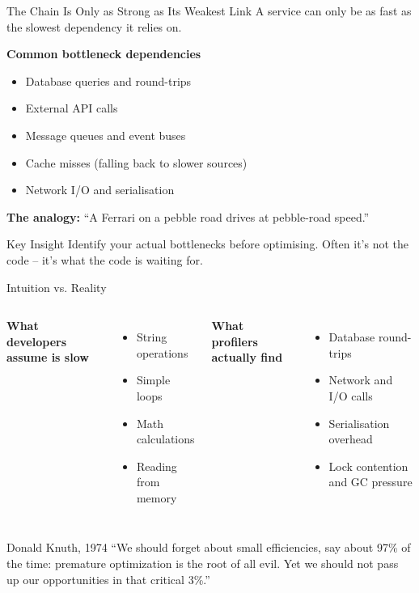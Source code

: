 \documentclass[aspectratio=1610, xcolor=table]{beamer}
\begin{document}
\begin{frame}{The Chain Is Only as Strong as Its Weakest Link}
	A service can only be as fast as the slowest dependency it relies on.

	\vspace{1em}
	\textbf{Common bottleneck dependencies}
	\begin{itemize}
		\item Database queries and round-trips
		\item External API calls
		\item Message queues and event buses
		\item Cache misses (falling back to slower sources)
		\item Network I/O and serialisation
	\end{itemize}

	\vspace{0.5em}
	\textcolor{SecondaryAccent}{\textbf{The analogy:}}
	``A Ferrari on a pebble road drives at pebble-road speed.''

	\vspace{0.5em}
	\begin{alertblock}{Key Insight}
		Identify your actual bottlenecks before optimising.
		Often it's not the code -- it's what the code is waiting for.
	\end{alertblock}
\end{frame}

\begin{frame}{Intuition vs. Reality}
	\begin{columns}[T]
		\textbf{What developers assume is slow}
		\begin{itemize}
			\item String operations
			\item Simple loops
			\item Math calculations
			\item Reading from memory
		\end{itemize}

		\textbf{What profilers actually find}
		\begin{itemize}
			\item Database round-trips
			\item Network and I/O calls
			\item Serialisation overhead
			\item Lock contention and GC pressure
		\end{itemize}
	\end{columns}

	\vspace{1.5em}
	\begin{block}{Donald Knuth, 1974}
		``We should forget about small efficiencies, say about 97\% of the time: premature optimization is the root of all evil.
		Yet we should not pass up our opportunities in that critical 3\%.''
	\end{block}
\end{frame}
\end{document}
